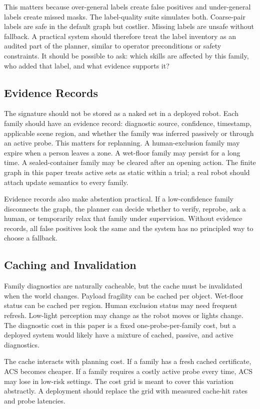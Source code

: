 \documentclass{article}
\newcommand{\ACS}{\textsc{ACS}}
\begin{document}
This matters because over-general labels create false positives and under-general labels create missed masks. The label-quality suite simulates both. Coarse-pair labels are safe in the default graph but costlier. Missing labels are unsafe without fallback. A practical system should therefore treat the label inventory as an audited part of the planner, similar to operator preconditions or safety constraints. It should be possible to ask: which skills are affected by this family, who added that label, and what evidence supports it?

\subsection{Evidence Records}

The signature should not be stored as a naked set in a deployed robot. Each family should have an evidence record: diagnostic source, confidence, timestamp, applicable scene region, and whether the family was inferred passively or through an active probe. This matters for replanning. A human-exclusion family may expire when a person leaves a zone. A wet-floor family may persist for a long time. A sealed-container family may be cleared after an opening action. The finite graph in this paper treats active sets as static within a trial; a real robot should attach update semantics to every family.

Evidence records also make abstention practical. If a low-confidence family disconnects the graph, the planner can decide whether to verify, reprobe, ask a human, or temporarily relax that family under supervision. Without evidence records, all false positives look the same and the system has no principled way to choose a fallback.

\subsection{Caching and Invalidation}

Family diagnostics are naturally cacheable, but the cache must be invalidated when the world changes. Payload fragility can be cached per object. Wet-floor status can be cached per region. Human exclusion status may need frequent refresh. Low-light perception may change as the robot moves or lights change. The diagnostic cost in this paper is a fixed one-probe-per-family cost, but a deployed system would likely have a mixture of cached, passive, and active diagnostics.

The cache interacts with planning cost. If a family has a fresh cached certificate, \ACS{} becomes cheaper. If a family requires a costly active probe every time, \ACS{} may lose in low-risk settings. The cost grid is meant to cover this variation abstractly. A deployment should replace the grid with measured cache-hit rates and probe latencies.
\end{document}
